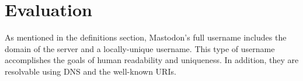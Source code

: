 \chapter{Evaluation}
\label{cha:evaluation}

As mentioned in the definitions section, Mastodon's full username includes the domain of the server and a locally-unique username. This type of username accomplishes the goals of human readability and uniqueness. In addition, they are resolvable using DNS and the well-known URIs.\\

